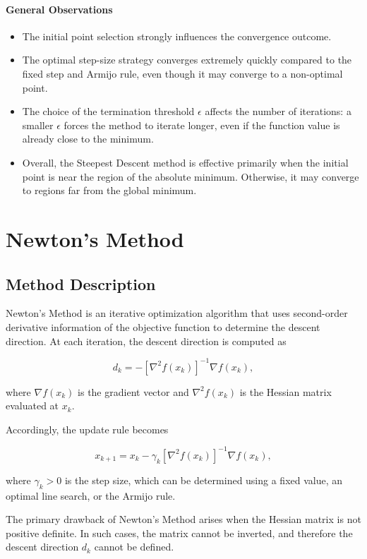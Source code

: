 \documentclass[11pt]{article}
\begin{document}
\paragraph{General Observations}
\begin{itemize}
    \item The initial point selection strongly influences the convergence outcome.
    \item The optimal step-size strategy converges extremely quickly compared to the fixed step and Armijo rule, even though it may converge to a non-optimal point.
    \item The choice of the termination threshold $\epsilon$ affects the number of iterations: a smaller $\epsilon$ forces the method to iterate longer, even if the function value is already close to the minimum.
    \item Overall, the Steepest Descent method is effective primarily when the initial point is near the region of the absolute minimum. Otherwise, it may converge to regions far from the global minimum.
\end{itemize}

\section{Newton's Method}

\subsection{Method Description}

Newton's Method is an iterative optimization algorithm that uses second-order derivative information of the objective function to determine the descent direction.  
At each iteration, the descent direction is computed as

\[
d_k = -[\nabla^2 f(x_k)]^{-1} \nabla f(x_k),
\]

where $\nabla f(x_k)$ is the gradient vector and $\nabla^2 f(x_k)$ is the Hessian matrix evaluated at $x_k$.  

Accordingly, the update rule becomes

\[
x_{k+1} = x_k - \gamma_k [\nabla^2 f(x_k)]^{-1} \nabla f(x_k),
\]

where $\gamma_k > 0$ is the step size, which can be determined using a fixed value, an optimal line search, or the Armijo rule.

The primary drawback of Newton's Method arises when the Hessian matrix is not positive definite. In such cases, the matrix cannot be inverted, and therefore the descent direction $d_k$ cannot be defined.  
\end{document}

